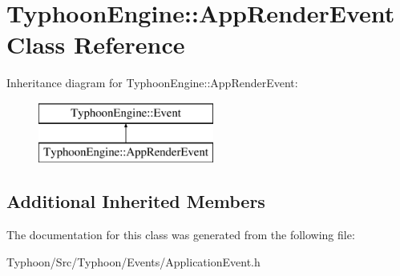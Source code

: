 \hypertarget{class_typhoon_engine_1_1_app_render_event}{}\section{Typhoon\+Engine\+::App\+Render\+Event Class Reference}
\label{class_typhoon_engine_1_1_app_render_event}
Inheritance diagram for Typhoon\+Engine\+::App\+Render\+Event\+:\begin{figure}[H]
\begin{center}
\leavevmode
\includegraphics[height=2.000000cm]{class_typhoon_engine_1_1_app_render_event}
\end{center}
\end{figure}
\subsection*{Additional Inherited Members}


The documentation for this class was generated from the following file\+:\begin{DoxyCompactItemize}
\item 
Typhoon/\+Src/\+Typhoon/\+Events/Application\+Event.\+h\end{DoxyCompactItemize}
